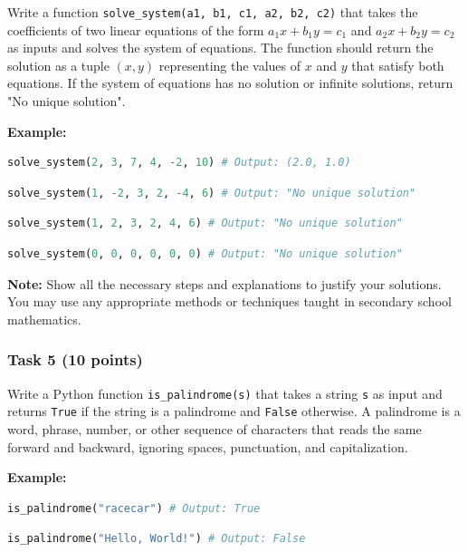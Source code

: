 \documentclass[12pt]{article}
\begin{document}
Write a function \texttt{solve\_system(a1, b1, c1, a2, b2, c2)} that takes the coefficients of two linear equations of the form $a_1x + b_1y = c_1$ and $a_2x + b_2y = c_2$ as inputs and solves the system of equations. The function should return the solution as a tuple $(x, y)$ representing the values of $x$ and $y$ that satisfy both equations. If the system of equations has no solution or infinite solutions, return "No unique solution".

\textbf{Example:}
\begin{lstlisting}[language=Python]
solve_system(2, 3, 7, 4, -2, 10) # Output: (2.0, 1.0)
\end{lstlisting}

\begin{lstlisting}[language=Python]
solve_system(1, -2, 3, 2, -4, 6) # Output: "No unique solution"
\end{lstlisting}

\begin{lstlisting}[language=Python]
solve_system(1, 2, 3, 2, 4, 6) # Output: "No unique solution"
\end{lstlisting}

\begin{lstlisting}[language=Python]
solve_system(0, 0, 0, 0, 0, 0) # Output: "No unique solution"
\end{lstlisting}

\textbf{Note:} Show all the necessary steps and explanations to justify your solutions. You may use any appropriate methods or techniques taught in secondary school mathematics.

\subsubsection{Task 5 (10 points)}
Write a Python function \texttt{is\_palindrome(s)} that takes a string \texttt{s} as input and returns \texttt{True} if the string is a palindrome and \texttt{False} otherwise. A palindrome is a word, phrase, number, or other sequence of characters that reads the same forward and backward, ignoring spaces, punctuation, and capitalization.

\textbf{Example:}
\begin{lstlisting}[language=Python]
is_palindrome("racecar") # Output: True
\end{lstlisting}


\begin{lstlisting}[language=Python]
is_palindrome("Hello, World!") # Output: False
\end{lstlisting}
\end{document}
